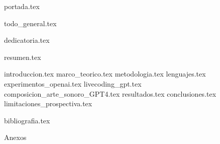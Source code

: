 \documentclass[a4paper,openany,oneside,12pt]{report}
\newcounter{inicioContenido}
\newcounter{finContenido}
\newcounter{antesAnexos} %
\begin{document}
  {portada.tex}
  \setcounter{page}{2} %

  \pagecolor{yellow!30}
  \todototoc
  \clearpage
  \nopagecolor

  {todo_general.tex}
  \clearpage

  \thispagestyle{empty} 
  {dedicatoria.tex}
  \clearpage
  \thispagestyle{empty} %
  
  \pagestyle{fancy} 

  {resumen.tex}
  \clearpage
  

  \tableofcontents
  \clearpage

  \listoffigures 
  \clearpage


  \label{chap:glosario}
  \printglossary[title=Índice de acrónimos, toctitle=Índice de acrónimos]
  \clearpage

  \setcounter{inicioContenido}{\value{page}}

  {introduccion.tex}
  {marco_teorico.tex}
  {metodologia.tex}
  {lenguajes.tex}
  {experimentos_openai.tex}
  {livecoding_gpt.tex}
  {composicion_arte_sonoro_GPT4.tex}
  {resultados.tex}
  {conclusiones.tex}
  {limitaciones_prospectiva.tex}

  \setcounter{finContenido}{\value{page}}

  {bibliografia.tex}
  \setcounter{antesAnexos}{\value{page}}
  \clearpage


  \appendix
  \begin{titlepage}
    \centering
    \fontsize{26pt}{20.8pt}\selectfont\textcolor{azul_unir}{Anexos}
  \end{titlepage}
  \addtocounter{antesAnexos}{2}
  \setcounter{page}{\value{antesAnexos}}
\end{document}
